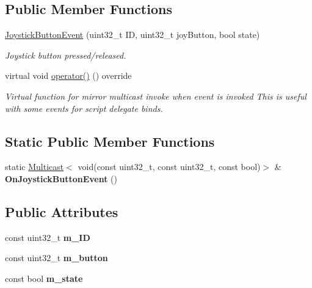 \subsection*{Public Member Functions}
\begin{DoxyCompactItemize}
\item 
\hyperlink{classJoystickButtonEvent_abfcc257bd057d77a7adae8fc7f7fa4a7}{Joystick\+Button\+Event} (uint32\+\_\+t ID, uint32\+\_\+t joy\+Button, bool state)
\begin{DoxyCompactList}\small\item\em Joystick button pressed/released. \end{DoxyCompactList}\item 
\mbox{\label{classJoystickButtonEvent_a368923d194c89772814414135ad78735}} 
virtual void \hyperlink{classJoystickButtonEvent_a368923d194c89772814414135ad78735}{operator()} () override
\begin{DoxyCompactList}\small\item\em Virtual function for mirror multicast invoke when event is invoked This is useful with some events for script delegate binds. \end{DoxyCompactList}\end{DoxyCompactItemize}
\subsection*{Static Public Member Functions}
\begin{DoxyCompactItemize}
\item 
\mbox{\label{classJoystickButtonEvent_a6c1c70ff563a322fdf6cfa5de7226077}} 
static \hyperlink{classMulticast}{Multicast}$<$ void(const uint32\+\_\+t, const uint32\+\_\+t, const bool)$>$ \& {\bfseries On\+Joystick\+Button\+Event} ()
\end{DoxyCompactItemize}
\subsection*{Public Attributes}
\begin{DoxyCompactItemize}
\item 
\mbox{\label{classJoystickButtonEvent_ac7fa26f6f1dea8bbbc55f5a4661544c4}} 
const uint32\+\_\+t {\bfseries m\+\_\+\+ID}
\item 
\mbox{\label{classJoystickButtonEvent_a240a43cd29ebc79fba58d3daf937e22d}} 
const uint32\+\_\+t {\bfseries m\+\_\+button}
\item 
\mbox{\label{classJoystickButtonEvent_af8c39c805a0ef7509defbf9fd88da5bd}} 
const bool {\bfseries m\+\_\+state}
\end{DoxyCompactItemize}
